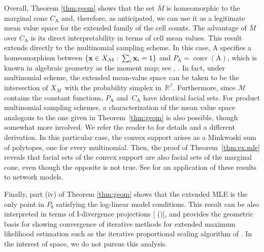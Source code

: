 \documentclass[aos,MSNbibl,nameyear,dvips]{arximspdf}
\newcommand{\m}[1]{\mathrm{#1}}
\begin{document}
Overall, Theorem \ref{thm:geom} shows that the set $\overline{M} $ is
homeomorphic to the margin\-al cone $C_{\m{A}}$ and, therefore, as
anticipated, we can use it as a legitimate mean value space for the
extended family of the cell counts. The advantage of $\overline{M} $
over $C_{\m{A}}$ is its direct interpretability in terms of cell mean
values.
This result extends directly to the multinomial sampling scheme. In
this case, $\m{A}$ specifies a homeomorphism between $\{\mathbf{x} \in
X_{\mathcal{M}} \dvtx \sum_i \mathbf{x}_i = 1\} $ and $P_{\m{A}} =
\operatorname{conv}(\m{A})$, which is known in algebraic geometry as
the moment map; see \citet{FUL78}, \citet{EWA96}. In fact, under
multinomial scheme, the extended mean-value space can be taken to be
the intersection of $X_{\mathcal{M}}$ with the probability simplex in~$\mathbb{R}^{\mathcal{I}}$. Furthermore, since $\mathcal{M}$ contains
the constant functions, $P_{\m{A}}$ and~$C_{\m{A}}$ have identical
facial sets.
For product multinomial sampling schemes, a characterization of the
mean value space analogous to the one given in Theorem~\ref{thm:geom}
is also possible, though somewhat more involved. We refer the reader to
\citet{JASON08} for details and a different derivation. In this
particular case, the convex support arises as a Minkwoski sum of
polytopes, one for every multinomial. Then, the proof of Theorem~\ref{thm:ex.mle} reveals that facial sets of the convex support are
also facial sets of the marginal cone, even though the opposite is not
true. See \citet{NET} for an application of these results to network
models.

Finally, part  (iv) of Theorem \ref{thm:geom} shows that the extended
MLE is the only point in $P_{\mathbf{t}}$ satisfying the log-linear
model conditions. This result can be also interpreted in terms of
I-divergence projections [\citeauthor{CS75} (\citeyear{CS75,CSI89})], and provides
the geometric basis for showing convergence of iterative methods for
extended maximum likelihood estimation such as the iterative
proportional scaling algorithm of \citet{DARRAT72}. In the interest of
space, we do not pursue this analysis.\vspace*{-2pt}
\end{document}
